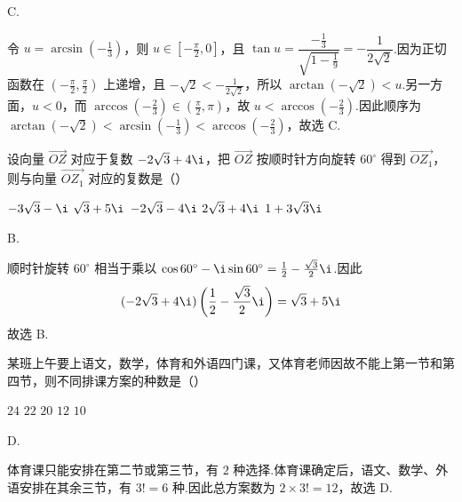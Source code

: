 \begin{answer}
C.
\end{answer}

\begin{solution}
令 \(u=\arcsin(-\frac13)\)，则 \(u\in[-\frac\pi2,0]\)，且 \(\tan u=\dfrac{-\frac{1}{3}}{\sqrt{1-\frac{1}{9}}}=-\dfrac{1}{2\sqrt2}\).因为正切函数在 \((-\frac\pi2,\frac\pi2)\) 上递增，且 \(-\sqrt2< -\frac{1}{2\sqrt2}\)，所以 \(\arctan(-\sqrt2)<u\).另一方面，\(u<0\)，而 \(\arccos(-\frac23)\in(\frac\pi2,\pi)\)，故 \(u<\arccos(-\frac23)\).因此顺序为 \(\arctan(-\sqrt2)<\arcsin(-\frac13)<\arccos(-\frac23)\)，故选 C.
\end{solution}

\begin{problem}

设向量 \(\overrightarrow{OZ} \) 对应于复数 \(-2\sqrt{3} + 4\i \)，把 \(\overrightarrow{OZ} \) 按顺时针方向旋转 \(60^\circ \) 得到 \(\overrightarrow{OZ_1} \)，则与向量 \(\overrightarrow{OZ_1} \) 对应的复数是（\quad）

\choicesfive
    {\(-3\sqrt{3}-\i \)}
    {\(\sqrt{3}+5\i \)}
    {\(-2\sqrt{3}-4\i \)}
    {\(2\sqrt{3} + 4\i \)}
    {\(1 + 3\sqrt{3}\i \)}
\end{problem}

\begin{answer}
B.
\end{answer}

\begin{solution}
顺时针旋转 \(60^\circ\) 相当于乘以 \(\cos60^\circ-\i\sin60^\circ=\frac12-\frac{\sqrt3}{2}\i\).因此
\[
(-2\sqrt3+4\i)\left(\frac12-\frac{\sqrt3}{2}\i\right)=\sqrt3+5\i
\]
故选 B.
\end{solution}

\begin{problem}

某班上午要上语文，数学，体育和外语四门课，又体育老师因故不能上第一节和第四节，则不同排课方案的种数是（\quad）

\choicesfive
    {\(24\)}
    {\(22\)}
    {\(20\)}
    {\(12\)}
    {\(10\)}
\end{problem}

\begin{answer}
D.
\end{answer}

\begin{solution}
体育课只能安排在第二节或第三节，有 \(2\) 种选择.体育课确定后，语文、数学、外语安排在其余三节，有 \(3!=6\) 种.因此总方案数为 \(2\times3!=12\)，故选 D.
\end{solution}

